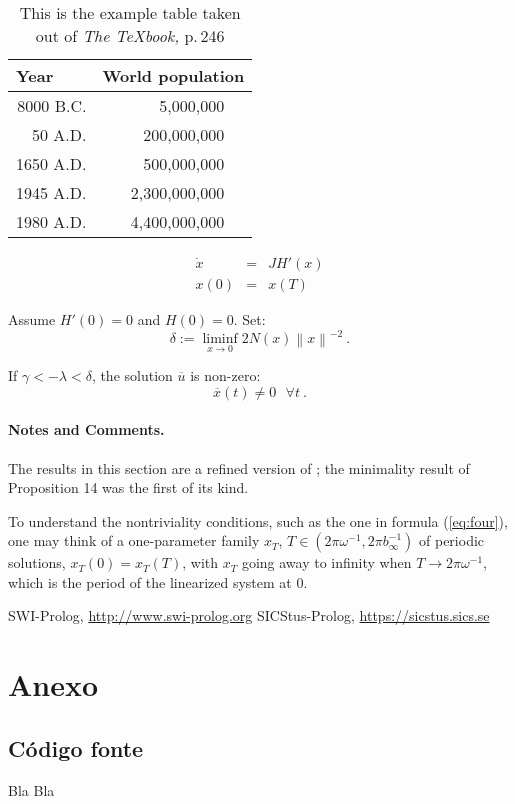 \documentclass{llncs}
\begin{document}
\begin{table}
\caption{This is the example table taken out of {\it The
\TeX{}book,} p.\,246}
\begin{center}
\begin{tabular}{r@{\quad}rl}
\hline
\multicolumn{1}{l}{\rule{0pt}{12pt}
                   Year}&\multicolumn{2}{l}{World population}\\[2pt]
\hline\rule{0pt}{12pt}
8000 B.C.  &     5,000,000& \\
  50 A.D.  &   200,000,000& \\
1650 A.D.  &   500,000,000& \\
1945 A.D.  & 2,300,000,000& \\
1980 A.D.  & 4,400,000,000& \\[2pt]
\hline
\end{tabular}
\end{center}
\end{table}

\begin{equation}
\begin{array}{rcl}
  \dot{x}&=&JH' (x)\\
  x(0)&=&x (T)
\end{array}
\end{equation}


\begin{proposition}
Assume $H'(0)=0$ and $ H(0)=0$. Set:
\begin{equation}
  \delta := \liminf_{x\to 0} 2 N (x) \left\|x\right\|^{-2}\ .
  \label{eq:one}
\end{equation}

If $\gamma < - \lambda < \delta$,
the solution $\overline{u}$ is non-zero:
\begin{equation}
  \overline{x} (t) \ne 0\ \ \ \forall t\ .
\end{equation}
\end{proposition}


\paragraph{Notes and Comments.}
The results in this section are a
refined version of \cite{clar:eke};
the minimality result of Proposition
14 was the first of its kind.

To understand the nontriviality conditions, such as the one in formula
(\ref{eq:four}), one may think of a one-parameter family
$x_{T}$, $T\in \left(2\pi\omega^{-1}, 2\pi b_{\infty}^{-1}\right)$
of periodic solutions, $x_{T} (0) = x_{T} (T)$,
with $x_{T}$ going away to infinity when $T\to 2\pi \omega^{-1}$,
which is the period of the linearized system at 0.

%
%
\begin{thebibliography}{5}
%
SWI-Prolog,
\url{http://www.swi-prolog.org}
SICStus-Prolog,
\url{https://sicstus.sics.se}


\end{thebibliography}
\clearpage

\section*{Anexo}
\subsection*{Código fonte}

Bla Bla
\end{document}
